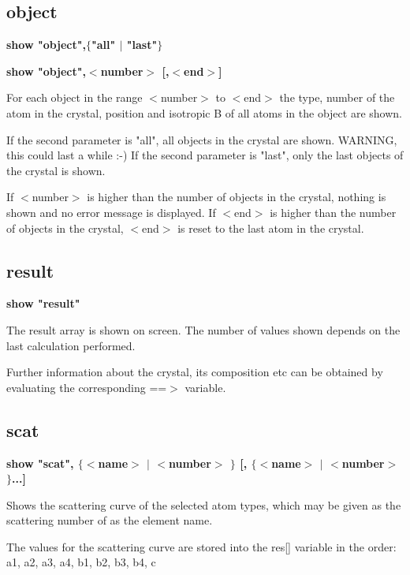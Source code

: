 \subsection*{object}
{\bf show "object",$ \{$"all" $| $ "last"$\} $ \par }
{\bf show "object",$ <$number$> $ [,$ <$end$> $] \par }
\par
\vspace{3pt}
For each object in the range $ <$number$> $ to $ <$end$> $ the type, number of the 
atom in the crystal, position and isotropic B of all atoms in the object 
are shown. 
\par
If the second parameter is "all", all objects in the crystal are shown. 
WARNING, this could last a while :-) 
If the second parameter is "last", only the last objects of the crystal 
is shown. 
\par
If $ <$number$> $ is higher than the number of objects in the crystal, nothing 
is shown and no error message is displayed. 
If $ <$end$> $ is higher than the number of objects in the crystal, $ <$end$> $ is 
reset to the last atom in the crystal. 
\subsection*{result}
{\bf show "result" \par }
\par
\vspace{3pt}
The result array is shown on screen. The number of values shown 
depends on the last calculation performed. 
\par
Further information about the crystal, its composition etc can be obtained 
by evaluating the corresponding ==$> $ variable. 
\subsection*{scat}
{\bf show "scat", $ \{$$ <$name$> $ $| $ $ <$number$> $ $\} $ [, $ \{$$ <$name$> $ $| $ $ <$number$> $ $\} $...] \par }
\par
\vspace{3pt}
Shows the scattering curve of the selected atom types, which may be 
given as the scattering number of as the element name. 
\par
The values for the scattering curve are stored into the res[] 
variable in the order: 
a1, a2, a3, a4,  b1, b2, b3, b4, c 

